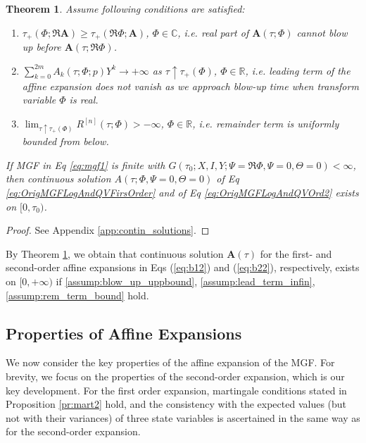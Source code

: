 \documentclass[pdftex,11pt,a4paper] {article}
\newtheorem{theorem}{Theorem}[section]
\begin{document}
\begin{theorem}\label{thm:contin_solutions}
Assume following conditions are satisfied:
\begin{enumerate}%
\item \label{assump:blow_up_uppbound}  $\tau_+(\Phi;\Re \mathbf{A})\ge \tau_+(\Re \Phi; \mathbf{A})$, $\Phi\in \mathbb{C}$, i.e. real part of  $\mathbf{A}(\tau;\Phi)$ cannot blow up before $\mathbf{A}(\tau;\Re\Phi)$.

\item \label{assump:lead_term_infin} $\sum_{k=0}^{2m} A_k(\tau;\Phi;p)Y^k \to +\infty$ as $\tau\uparrow \tau_+(\Phi)$, $\Phi\in \mathbb{R}$, i.e. leading term of the affine expansion does not vanish as we approach blow-up time when transform variable $\Phi$ is real. 

\item \label{assump:rem_term_bound} $\lim_{\tau\uparrow \tau_+(\Phi)}R^{[n]}(\tau;\Phi)>-\infty$, $\Phi\in \mathbb{R}$, i.e. remainder term is uniformly bounded from below.
\end{enumerate}

If MGF in Eq \eqref{eq:mgf1} is finite with $G(\tau_0;X,I,Y; \Psi=\Re \Phi,\Psi=0,\Theta=0)<\infty$, 
then continuous solution $A(\tau;\Phi,\Psi=0,\Theta=0)$ of Eq \eqref{eq:OrigMGFLogAndQVFirsOrder} and of Eq \eqref{eq:OrigMGFLogAndQVOrd2} exists on $[0,\tau_0)$.
\end{theorem}

\begin{proof}
See Appendix \ref{app:contin_solutions}.
\end{proof}

By Theorem \ref{thm:contin_solutions}, we obtain that continuous solution $\mathbf{A}(\tau)$ for the first- and second-order affine expansions in Eqs (\ref{eq:b12}) and (\ref{eq:b22}), respectively, exists on $[0, +\infty)$ if \ref{assump:blow_up_uppbound}, \ref{assump:lead_term_infin}, \ref{assump:rem_term_bound} hold.



\subsection{Properties of Affine Expansions}

We now consider the key properties of the affine expansion of the MGF. For brevity, we focus on the properties of the second-order expansion, which is our key development. For the first order expansion, martingale conditions stated in Proposition \ref{pr:mart2} hold, and the consistency with the expected values (but not with their variances) of three state variables is ascertained in the same way as for the second-order expansion.
\end{document}
